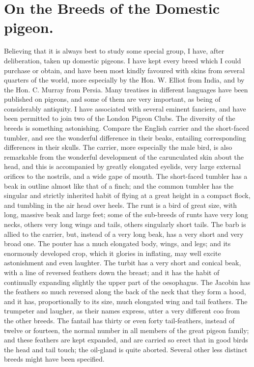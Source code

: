 \section{On the Breeds of the Domestic pigeon.}
\indent Believing that it is always best to study some special group, I have, after deliberation, taken up domestic pigeons. I have kept every breed which I could purchase or obtain, and have been most kindly favoured with skins from several quarters of the world, more especially by the Hon. W. Elliot from India, and by the Hon. C.  Murray from Persia. Many treatises in different languages have been published on pigeons, and some of them are very important, as being of considerably antiquity. I have associated with several eminent fanciers, and have been permitted to join two of the London Pigeon Clubs. The diversity of the breeds is something astonishing.  Compare the English carrier and the short-faced tumbler, and see the wonderful difference in their beaks, entailing corresponding differences in their skulls. The carrier, more especially the male bird, is also remarkable from the wonderful development of the carunculated skin about the head, and this is accompanied by greatly elongated eyelids, very large external orifices to the nostrils, and a wide gape of mouth.  The short-faced tumbler has a beak in outline almost like that of a finch; and the common tumbler has the singular and strictly inherited habit of flying at a great height in a compact flock, and tumbling in the air head over heels. The runt is a bird of great size, with long, massive beak and large feet; some of the sub-breeds of runts have very long necks, others very long wings and tails, others singularly short tails. The barb is allied to the carrier, but, instead of a very long beak, has a very short and very broad one.  The pouter has a much elongated body, wings, and legs; and its enormously developed crop, which it glories in inflating, may well excite astonishment and even laughter.  The turbit has a very short and conical beak, with a line of reversed feathers down the breast; and it has the habit of continually expanding slightly the upper part of the oesophagus. The Jacobin has the feathers so much reversed along the back of the neck that they form a hood, and it has, proportionally to its size, much elongated wing and tail feathers. The trumpeter and laugher, as their names express, utter a very different coo from the other breeds.  The fantail has thirty or even forty tail-feathers, instead of twelve or fourteen, the normal number in all members of the great pigeon family; and these feathers are kept expanded, and are carried so erect that in good birds the head and tail touch; the oil-gland is quite aborted. Several other less distinct breeds might have been specified.  \\
